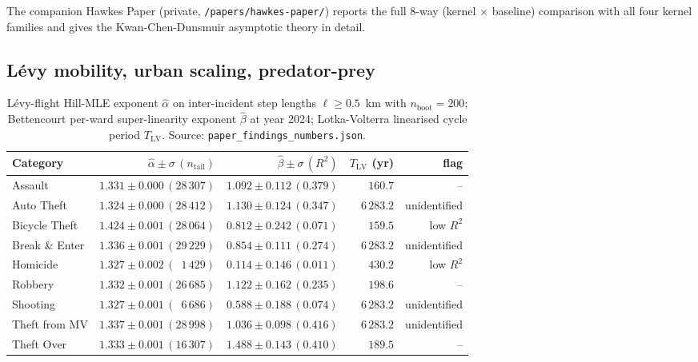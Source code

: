 \documentclass[11pt,a4paper]{article}
\newcommand{\1}{\mathbf{1}}
\theoremstyle{plain}
\theoremstyle{definition}
\begin{document}
The companion Hawkes Paper (private,
\texttt{/papers/hawkes-paper/}) reports the full 8-way
(kernel $\times$ baseline) comparison with all four kernel families
and gives the Kwan-Chen-Dunsmuir asymptotic theory in detail.

\subsection{Lévy mobility, urban scaling, predator-prey}\label{sec:scaling}

\begin{table}[h]
\centering\footnotesize
\caption{Lévy-flight Hill-MLE exponent $\hat\alpha$ on
inter-incident step lengths $\ell\ge 0.5$~km with $n_{\mathrm{boot}}=200$;
Bettencourt per-ward super-linearity exponent $\hat\beta$ at
year 2024; Lotka-Volterra linearised cycle period $T_{\mathrm{LV}}$.
Source: \texttt{paper\_findings\_numbers.json}.}
\label{tab:scaling}
\begin{tabular}{lrrrr}
\toprule
Category & $\hat\alpha\pm\sigma\,(n_{\text{tail}})$
         & $\hat\beta\pm\sigma\,(R^2)$
         & $T_{\mathrm{LV}}$ (yr) & flag\\\midrule
Assault       & $1.331\pm 0.000\,(28\,307)$ & $1.092\pm 0.112\,(0.379)$ & $\phantom{6\,}160.7$  & --\\
Auto Theft    & $1.324\pm 0.000\,(28\,412)$ & $1.130\pm 0.124\,(0.347)$ & $6\,283.2$ & unidentified\\
Bicycle Theft & $1.424\pm 0.001\,(28\,064)$ & $0.812\pm 0.242\,(0.071)$ & $\phantom{6\,}159.5$  & low $R^2$\\
Break \& Enter& $1.336\pm 0.001\,(29\,229)$ & $0.854\pm 0.111\,(0.274)$ & $6\,283.2$ & unidentified\\
Homicide      & $1.327\pm 0.002\,(\phantom{0}1\,429)$ & $0.114\pm 0.146\,(0.011)$ & $\phantom{6\,}430.2$  & low $R^2$\\
Robbery       & $1.332\pm 0.001\,(26\,685)$ & $1.122\pm 0.162\,(0.235)$ & $\phantom{6\,}198.6$  & --\\
Shooting      & $1.327\pm 0.001\,(\phantom{0}6\,686)$ & $0.588\pm 0.188\,(0.074)$ & $6\,283.2$ & unidentified\\
Theft from MV & $1.337\pm 0.001\,(28\,998)$ & $1.036\pm 0.098\,(0.416)$ & $6\,283.2$ & unidentified\\
Theft Over    & $1.333\pm 0.001\,(16\,307)$ & $1.488\pm 0.143\,(0.410)$ & $\phantom{6\,}189.5$  & --\\
\bottomrule
\end{tabular}
\end{table}
\end{document}
